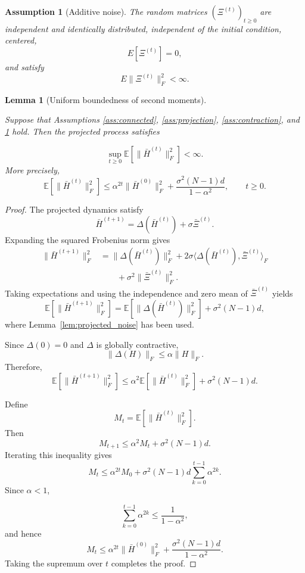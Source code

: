 \documentclass[10pt,a4paper]{amsart}
\newtheorem{lemma}{Lemma}
\newtheorem{assumption}{Assumption}
\begin{document}
\begin{assumption}[Additive noise]
	\label{ass:noise}	
	The random matrices
	$(\Xi^{(t)})_{t\ge0}$
	are independent and identically distributed,
	independent of the initial condition,
	centered,	
	\[
	E[\Xi^{(t)}]=0,
	\]	
	and satisfy
	\[
	E\|\Xi^{(t)}\|_F^2<\infty.
	\]	
\end{assumption}

\begin{lemma}[Uniform boundedness of second moments]
	\label{lem:uniform_second_moment}
	
Suppose that Assumptions
\ref{ass:connected},
\ref{ass:projection},
\ref{ass:contraction},
and
\ref{ass:noise}
hold.	
	Then the projected process satisfies
	
	\[
	\sup_{t\ge0}
	\mathbb E
	\!\left[
	\|\bar H^{(t)}\|_F^2
	\right]
	<
	\infty.
	\]
	More precisely,	
	\[
	\mathbb E
	\!\left[
	\|\bar H^{(t)}\|_F^2
	\right]
	\le
	\alpha^{2t}
	\|\bar H^{(0)}\|_F^2
	+
	\frac{\sigma^2 (N-1)d}
	{1-\alpha^2},
	\qquad
	t\ge0.
	\]
	
\end{lemma}

\begin{proof}
	
	The projected dynamics satisfy	
	\[
	\bar H^{(t+1)}
	=
	\Delta(\bar H^{(t)})
	+
	\sigma\bar\Xi^{(t)}.
	\]
	Expanding the squared Frobenius norm gives	
	\[
	\begin{aligned}
		\|\bar H^{(t+1)}\|_F^2
		&=
		\|\Delta(\bar H^{(t)})\|_F^2
		+
		2\sigma
		\langle
		\Delta(\bar H^{(t)}),
		\bar\Xi^{(t)}
		\rangle_F
		\\
		&\qquad
		+
		\sigma^2
		\|\bar\Xi^{(t)}\|_F^2.
	\end{aligned}
	\]
	Taking expectations and using the independence and zero mean of
	\(\bar\Xi^{(t)}\) yields	
	\[
	\mathbb E
	\!\left[
	\|\bar H^{(t+1)}\|_F^2
	\right]
	=
	\mathbb E
	\!\left[
	\|\Delta(\bar H^{(t)})\|_F^2
	\right]
	+
	\sigma^2 (N-1)d,
	\]	
	where Lemma~\ref{lem:projected_noise} has been used.
	
	Since
	\(\Delta(0)=0\)
	and
	\(\Delta\)
	is globally contractive,	
	\[
	\|\Delta(H)\|_F
	\le
	\alpha
	\|H\|_F.
	\]	
	Therefore,	
	\[
	\mathbb E
	\!\left[
	\|\bar H^{(t+1)}\|_F^2
	\right]
	\le
	\alpha^2
	\mathbb E
	\!\left[
	\|\bar H^{(t)}\|_F^2
	\right]
	+
	\sigma^2 (N-1)d.
	\]
	
	Define	
	\[
	M_t
	=
	\mathbb E
	\!\left[
	\|\bar H^{(t)}\|_F^2
	\right].
	\]
	Then	
	\[
	M_{t+1}
	\le
	\alpha^2 M_t
	+
	\sigma^2 (N-1)d.
	\]
	Iterating this inequality gives
	\[
	M_t
	\le
	\alpha^{2t}M_0
	+
	\sigma^2 (N-1)d
	\sum_{k=0}^{t-1}
	\alpha^{2k}.
	\]
	Since
	\(\alpha<1\),
	
	\[
	\sum_{k=0}^{t-1}
	\alpha^{2k}
	\le
	\frac{1}{1-\alpha^2},
	\]
	and hence	
	\[
	M_t
	\le
	\alpha^{2t}
	\|\bar H^{(0)}\|_F^2
	+
	\frac{\sigma^2 (N-1)d}
	{1-\alpha^2}.
	\]
	Taking the supremum over
	\(t\)
	completes the proof.
	
\end{proof}
\end{document}
